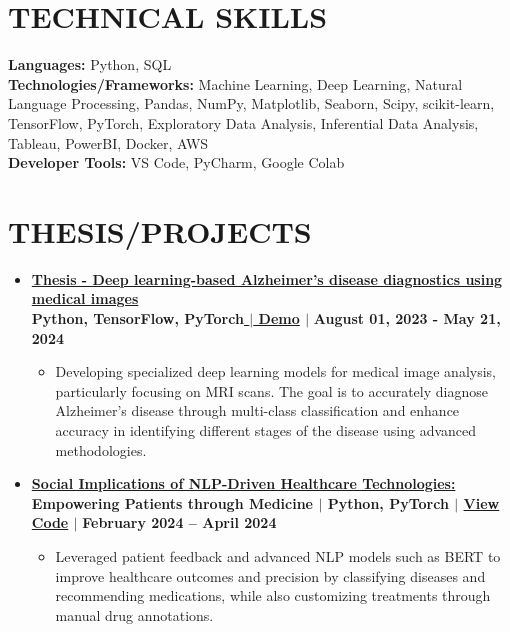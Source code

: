 \documentclass[letterpaper,11pt]{article}
\newcommand{\resumeItem}[1]{
  \item\small{
    {#1 \vspace{-2pt}}
  }
}
\newcommand{\resumeProjectHeading}[2]{
    \item
    \textbf{#1} \hfill \textbf{#2}\par
}
\newcommand{\resumeSubHeadingListStart}{\begin{itemize}[leftmargin=0.0in, label={}]}
\newcommand{\resumeSubHeadingListEnd}{\end{itemize}}
\newcommand{\resumeItemListStart}{\begin{itemize}}
\newcommand{\resumeItemListEnd}{\end{itemize}\vspace{-5pt}}
\begin{document}
\section{TECHNICAL SKILLS}
 \begin{itemize}[leftmargin=0.15in, label={}]
    \small{\item{
     \textbf{\normalsize{Languages:}}{  \normalsize{Python, SQL}} \\
     \textbf{\normalsize{Technologies/Frameworks:}}{  \normalsize{Machine Learning, Deep Learning, Natural Language Processing, Pandas, NumPy, Matplotlib, Seaborn, Scipy, scikit-learn, TensorFlow, PyTorch, Exploratory Data Analysis, Inferential Data Analysis, Tableau, PowerBI, Docker, AWS
}} \\
     \textbf{\normalsize{Developer Tools:}}{  \normalsize{VS Code, PyCharm, Google Colab }} \\
    }}
 \end{itemize}
 \vspace{-15pt}


\section{THESIS/PROJECTS}




\resumeSubHeadingListStart
    \resumeProjectHeading
    {\textbf{\large{\underline{Thesis - Deep learning-based Alzheimer’s disease diagnostics using medical images }}} \large{\textbf{\\ Python, TensorFlow, PyTorch}}\href{https://drive.google.com/file/d/1EKDIsHLkLoA0w_0jGkaA0g-2UfU4z-q5/view}{\raisebox{-0.1\height}{\faExternalLink} $|$ Demo}  $|$} 
    {August 01, 2023 - May 21, 2024}
    \resumeItemListStart
        \resumeItem{\normalsize{Developing specialized deep learning models for medical image analysis, particularly focusing on MRI scans. The goal is to accurately diagnose Alzheimer's disease through multi-class classification and enhance accuracy in identifying different stages of the disease using advanced methodologies.}}

    \resumeItemListEnd



\resumeProjectHeading
{\textbf{\large{\underline{Social Implications of NLP-Driven Healthcare Technologies:}}} \textbf{\large{Empowering Patients through Medicine}} $|$ \large{\textbf{Python, PyTorch}} \href{https://github.com/mohammadserajansari}{\raisebox{-0.1\height}{\faExternalLink}} $|$ \href{https://github.com/mohammadserajansari}{View Code} $|$ }  
{February 2024 -- April 2024}
\resumeItemListStart
    \resumeItem{\normalsize{Leveraged patient feedback and advanced NLP models such as BERT to improve healthcare outcomes and precision by classifying diseases and recommending medications, while also customizing treatments through manual drug annotations.}}
\resumeItemListEnd
\resumeSubHeadingListEnd
\end{document}
